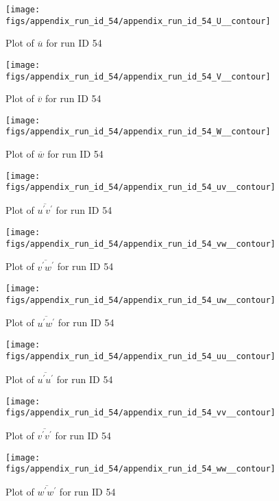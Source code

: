 \begin{figure}[H]
\centering
\texttt{[image: figs/appendix\_run\_id\_54/appendix\_run\_id\_54\_U\_\_contour]}
\caption{Plot of $\overline{u}$ for run ID 54}
\label{fig:appendix_run_id_54_U__contour}
\end{figure}


\begin{figure}[H]
\centering
\texttt{[image: figs/appendix\_run\_id\_54/appendix\_run\_id\_54\_V\_\_contour]}
\caption{Plot of $\overline{v}$ for run ID 54}
\label{fig:appendix_run_id_54_V__contour}
\end{figure}


\begin{figure}[H]
\centering
\texttt{[image: figs/appendix\_run\_id\_54/appendix\_run\_id\_54\_W\_\_contour]}
\caption{Plot of $\overline{w}$ for run ID 54}
\label{fig:appendix_run_id_54_W__contour}
\end{figure}


\begin{figure}[H]
\centering
\texttt{[image: figs/appendix\_run\_id\_54/appendix\_run\_id\_54\_uv\_\_contour]}
\caption{Plot of $\overline{u^\prime v^\prime}$ for run ID 54}
\label{fig:appendix_run_id_54_uv__contour}
\end{figure}


\begin{figure}[H]
\centering
\texttt{[image: figs/appendix\_run\_id\_54/appendix\_run\_id\_54\_vw\_\_contour]}
\caption{Plot of $\overline{v^\prime w^\prime}$ for run ID 54}
\label{fig:appendix_run_id_54_vw__contour}
\end{figure}


\begin{figure}[H]
\centering
\texttt{[image: figs/appendix\_run\_id\_54/appendix\_run\_id\_54\_uw\_\_contour]}
\caption{Plot of $\overline{u^\prime w^\prime}$ for run ID 54}
\label{fig:appendix_run_id_54_uw__contour}
\end{figure}


\begin{figure}[H]
\centering
\texttt{[image: figs/appendix\_run\_id\_54/appendix\_run\_id\_54\_uu\_\_contour]}
\caption{Plot of $\overline{u^\prime u^\prime}$ for run ID 54}
\label{fig:appendix_run_id_54_uu__contour}
\end{figure}


\begin{figure}[H]
\centering
\texttt{[image: figs/appendix\_run\_id\_54/appendix\_run\_id\_54\_vv\_\_contour]}
\caption{Plot of $\overline{v^\prime v^\prime}$ for run ID 54}
\label{fig:appendix_run_id_54_vv__contour}
\end{figure}


\begin{figure}[H]
\centering
\texttt{[image: figs/appendix\_run\_id\_54/appendix\_run\_id\_54\_ww\_\_contour]}
\caption{Plot of $\overline{w^\prime w^\prime}$ for run ID 54}
\label{fig:appendix_run_id_54_ww__contour}
\end{figure}


